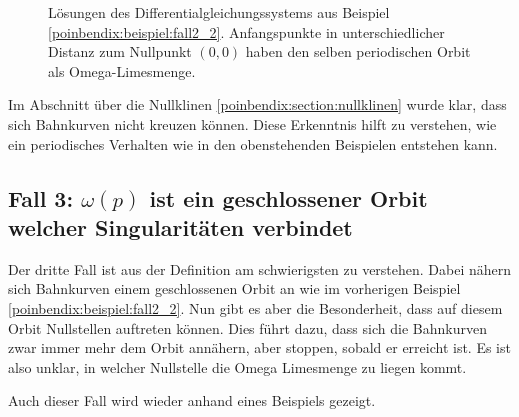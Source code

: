 \begin{figure}
\centering
    
    \caption{Lösungen des Differentialgleichungssystems aus Beispiel \ref{poinbendix:beispiel:fall2_2}.
    Anfangspunkte in unterschiedlicher Distanz zum Nullpunkt $(0,0)$ haben den selben periodischen Orbit als Omega-Limesmenge.}
\label{poinbendix:fig:fall_2_2}
\end{figure}

Im Abschnitt über die Nullklinen \ref{poinbendix:section:nullklinen} wurde klar, dass sich Bahnkurven nicht kreuzen können.
Diese Erkenntnis hilft zu verstehen, wie ein periodisches Verhalten wie in den obenstehenden Beispielen entstehen kann.

\subsection{Fall 3: $\omega(p)$ ist ein geschlossener Orbit welcher Singularitäten verbindet} \label{poinbendix:subsection:fall3}

Der dritte Fall ist aus der Definition am schwierigsten zu verstehen.
Dabei nähern sich Bahnkurven einem geschlossenen Orbit an wie im vorherigen Beispiel \ref{poinbendix:beispiel:fall2_2}.
Nun gibt es aber die Besonderheit, dass auf diesem Orbit Nullstellen auftreten können.
Dies führt dazu, dass sich die Bahnkurven zwar immer mehr dem Orbit annähern, aber stoppen, sobald er erreicht ist.
Es ist also unklar, in welcher Nullstelle die Omega Limesmenge zu liegen kommt.

Auch dieser Fall wird wieder anhand eines Beispiels gezeigt.


